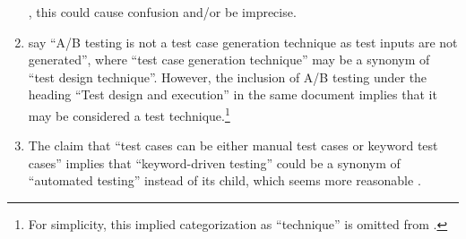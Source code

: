 \begin{enumerate}
          \citep{WikiHaskell2023}, this could cause confusion and/or be
          imprecise.
    \item %
          \citet[p.~36]{IEEE2022} say ``A/B testing is not a test
          case generation technique as test inputs are not generated'', where
          ``test case generation technique'' may be a synonym of ``test design
          technique''. However, the inclusion of A/B testing under the heading
          ``Test design and execution'' in the same document implies that it
          may be considered a test technique.\footnote{For simplicity, this
              implied categorization as ``technique'' is omitted from
              .}
    \item %
          The claim that ``test cases can be either manual test cases or
          keyword test cases'' \citep[p.~6]{IEEE2016} implies that ``keyword-driven
          testing'' could be a synonym of ``automated testing'' instead of its
          child, which seems more reasonable \citeyearpar[p.~4;][p.~35]{IEEE2022}.


\end{enumerate}
